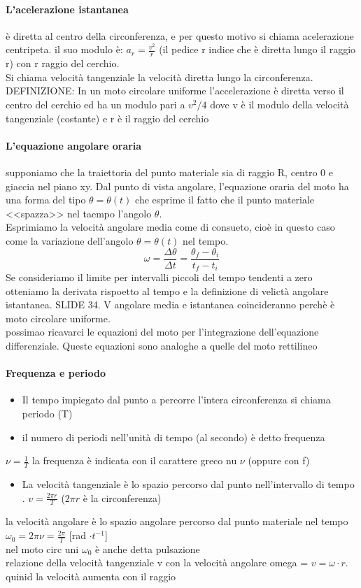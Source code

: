 \documentclass[12pt, a4paper, openany]{book}
\begin{document}
\paragraph*{L'acelerazione istantanea} è diretta al centro della circonferenza, e per questo motivo si chiama acelerazione centripeta. il suo modulo è: $a_r = \frac{v^2}{r}$ (il pedice r indice che è diretta lungo il raggio r) con r raggio del cerchio.
\\Si chiama velocità tangenziale la velocità diretta lungo la circonferenza.
\\DEFINIZIONE: In un moto circolare uniforme l'accelerazione è diretta verso il centro del cerchio ed ha un modulo pari a $v^2/4$ dove v è il modulo della velocità tangenziale (costante) e r è il raggio del cerchio
\paragraph*{L'equazione angolare oraria} supponiamo che la traiettoria del punto materiale sia di raggio R, centro 0 e giaccia nel piano xy.
Dal punto di vista angolare, l'equazione oraria del moto ha una forma del tipo $\theta = \theta(t)$ che esprime il fatto che il punto materiale <<spazza>> nel taempo l'angolo $\theta$.
\\Esprimiamo la velocità angolare media come di consueto, cioè in questo caso come la variazione dell'angolo $\theta = \theta(t)$ nel tempo.
$$\omega = \frac{\Delta \theta}{\Delta t} = \frac{\theta_f - \theta_i}{t_f - t_i}$$
Se consideriamo il limite per intervalli piccoli del tempo tendenti a zero otteniamo la derivata rispoetto al tempo e la definizione di velictà angolare istantanea. SLIDE 34.
V angolare media e istantanea coincideranno perchè è moto circolare uniforme.
\\possimao ricavarci le equazioni del moto per l'integrazione dell'equazione differenziale. Queste equazioni sono analoghe a quelle del moto rettilineo
\paragraph*{Frequenza e periodo} \begin{itemize}
    \item Il tempo impiegato dal punto a percorre l'intera circonferenza si chiama periodo (T)
    \item il numero di periodi nell'unità di tempo (al secondo) è detto frequenza
\end{itemize}
$\nu = \frac{1}{T}$ la frequenza è indicata con il carattere greco nu $\nu$ (oppure con f)
\begin{itemize}
    \item La velocità tangenziale è lo spazio percorso dal punto nell'intervallo di tempo . $v= \frac{2\pi r}{T}$ ($2\pi r$ è la circonferenza)
\end{itemize}
la velocità angolare è lo spazio angolare percorso dal punto materiale nel tempo $ \omega_0 = 2 \pi \nu = \frac{2 \pi }{T}$ [rad $\cdot t^{-1}$]
\\nel moto circ uni $\omega_0$ è anche detta pulsazione
\\relazione della velocità tangenziale v con la velocità angolare omega = $v = \omega \cdot r$. quinid la velocità aumenta con il raggio
\end{document}
